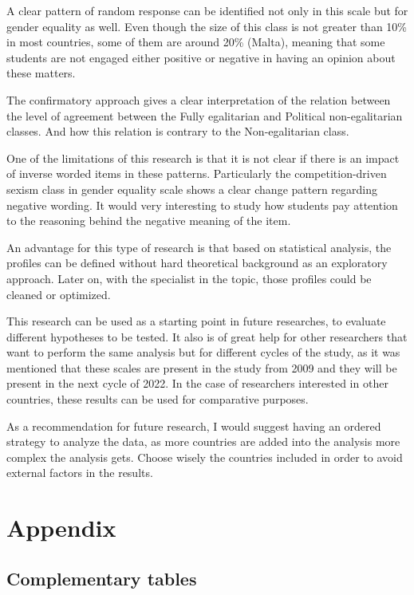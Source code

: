 \documentclass[12pt,a4paper,oneside]{reedthesis}
\begin{document}
A clear pattern of random response can be identified not only in this scale but for gender equality as well. Even though the size of this class is not greater than 10\% in most countries, some of them are around 20\% (Malta), meaning that some students are not engaged either positive or negative in having an opinion about these matters.

The confirmatory approach gives a clear interpretation of the relation between the level of agreement between the Fully egalitarian and Political non-egalitarian classes. And how this relation is contrary to the Non-egalitarian class.

One of the limitations of this research is that it is not clear if there is an impact of inverse worded items in these patterns. Particularly the competition-driven sexism class in gender equality scale shows a clear change pattern regarding negative wording. It would very interesting to study how students pay attention to the reasoning behind the negative meaning of the item.

An advantage for this type of research is that based on statistical analysis, the profiles can be defined without hard theoretical background as an exploratory approach. Later on, with the specialist in the topic, those profiles could be cleaned or optimized.

This research can be used as a starting point in future researches, to evaluate different hypotheses to be tested. It also is of great help for other researchers that want to perform the same analysis but for different cycles of the study, as it was mentioned that these scales are present in the study from 2009 and they will be present in the next cycle of 2022. In the case of researchers interested in other countries, these results can be used for comparative purposes.

As a recommendation for future research, I would suggest having an ordered strategy to analyze the data, as more countries are added into the analysis more complex the analysis gets. Choose wisely the countries included in order to avoid external factors in the results.

\appendix

\hypertarget{appendix}{%
\chapter{Appendix}\label{appendix}}

\hypertarget{complementary-tables}{%
\section{Complementary tables}\label{complementary-tables}}
\end{document}
